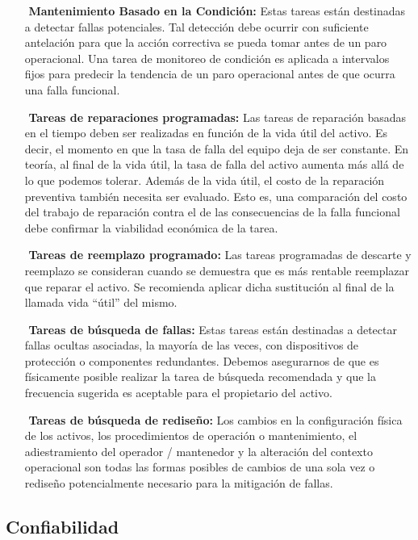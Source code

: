 \begin{itemize}
\item[$ $] \textbf{Mantenimiento Basado en la Condición:} Estas tareas están destinadas a detectar fallas potenciales. Tal detección debe ocurrir con suficiente antelación para que la acción correctiva se pueda tomar antes de un paro operacional. Una tarea de monitoreo de condición es aplicada a intervalos fijos para predecir la tendencia de un paro operacional antes de que ocurra una falla funcional.
\item[$ $] \textbf{Tareas de reparaciones programadas:} Las tareas de reparación basadas en el tiempo deben ser realizadas en función de la vida útil del activo. Es decir, el momento en que la tasa de falla del equipo deja de ser constante. En teoría, al final de la vida útil, la tasa de falla del activo aumenta más allá de lo que podemos tolerar. Además de la vida útil, el costo de la reparación preventiva también necesita ser evaluado. Esto es, una comparación del costo del trabajo de reparación contra el de las consecuencias de la falla funcional debe confirmar la viabilidad económica de la tarea.
\item[$ $] \textbf{Tareas de reemplazo programado:} Las tareas programadas de descarte y reemplazo se consideran cuando se demuestra que es más rentable reemplazar que reparar el activo. Se recomienda aplicar dicha sustitución al final de la llamada vida “útil” del mismo.
\item[$ $] \textbf{Tareas de búsqueda de fallas:} Estas tareas están destinadas a detectar fallas ocultas asociadas, la mayoría de las veces, con dispositivos de protección o componentes redundantes. Debemos asegurarnos de que es físicamente posible realizar la tarea de búsqueda recomendada y que la frecuencia sugerida es aceptable para el propietario del activo. 
\item[$ $] \textbf{Tareas de búsqueda de rediseño:} Los cambios en la configuración física de los activos, los procedimientos de operación o mantenimiento, el adiestramiento del operador / mantenedor y la alteración del contexto operacional son todas las formas posibles de cambios de una sola vez o rediseño potencialmente necesario para la mitigación de fallas.

\end{itemize}


\subsection{Confiabilidad}

